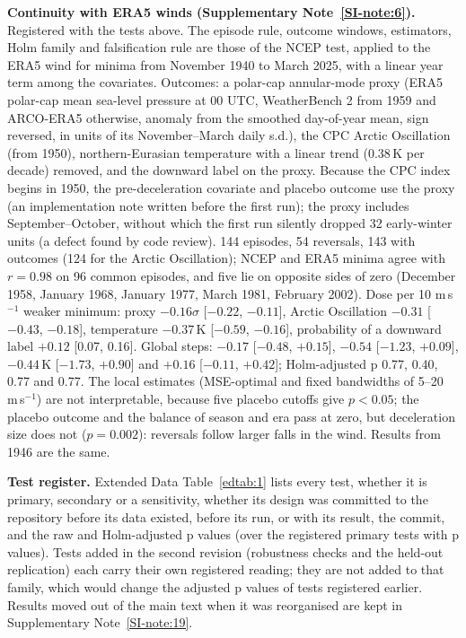 \documentclass[11pt]{article}
\begin{document}
\textbf{Continuity with ERA5 winds (Supplementary Note~\ref{SI-note:6}).} Registered with the tests above. The episode rule, outcome windows, estimators, Holm family and falsification rule are those of the NCEP test, applied to the ERA5 wind for minima from November 1940 to March 2025, with a linear year term among the covariates. Outcomes: a polar-cap annular-mode proxy (ERA5 polar-cap mean sea-level pressure at 00 UTC, WeatherBench 2 from 1959 and ARCO-ERA5 otherwise, anomaly from the smoothed day-of-year mean, sign reversed, in units of its November–March daily s.d.), the CPC Arctic Oscillation (from 1950), northern-Eurasian temperature with a linear trend (0.38\,K per decade) removed, and the downward label on the proxy. Because the CPC index begins in 1950, the pre-deceleration covariate and placebo outcome use the proxy (an implementation note written before the first run); the proxy includes September–October, without which the first run silently dropped 32 early-winter units (a defect found by code review). 144 episodes, 54 reversals, 143 with outcomes (124 for the Arctic Oscillation); NCEP and ERA5 minima agree with $r = 0.98$ on 96 common episodes, and five lie on opposite sides of zero (December 1958, January 1968, January 1977, March 1981, February 2002). Dose per 10 m\,s$^{-1}$ weaker minimum: proxy $-0.16\sigma$ [$-0.22$, $-0.11$], Arctic Oscillation $-0.31$ [$-0.43$, $-0.18$], temperature $-0.37$\,K [$-0.59$, $-0.16$], probability of a downward label $+0.12$ [0.07, 0.16]. Global steps: $-0.17$ [$-0.48$, $+0.15$], $-0.54$ [$-1.23$, $+0.09$], $-0.44$\,K [$-1.73$, $+0.90$] and $+0.16$ [$-0.11$, $+0.42$]; Holm-adjusted p 0.77, 0.40, 0.77 and 0.77. The local estimates (MSE-optimal and fixed bandwidths of 5–20 m\,s$^{-1}$) are not interpretable, because five placebo cutoffs give $p < 0.05$; the placebo outcome and the balance of season and era pass at zero, but deceleration size does not ($p = 0.002$): reversals follow larger falls in the wind. Results from 1946 are the same.

\textbf{Test register.} Extended Data Table~\ref{edtab:1} lists every test, whether it is primary, secondary or a sensitivity, whether its design was committed to the repository before its data existed, before its run, or with its result, the commit, and the raw and Holm-adjusted p values (over the registered primary tests with p values). Tests added in the second revision (robustness checks and the held-out replication) each carry their own registered reading; they are not added to that family, which would change the adjusted p values of tests registered earlier. Results moved out of the main text when it was reorganised are kept in Supplementary Note~\ref{SI-note:19}.
\end{document}
